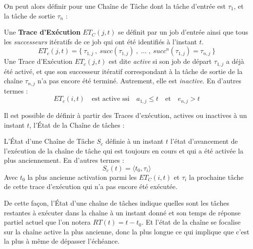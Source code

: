 \documentclass[french, a4paper, 11pt, twoside, pdftex]{StyleThese}
\begin{document}
    On peut alors définir pour une Chaîne de Tâche dont la tâche d'entrée est $\tau_{1}$, et la tâche de sortie $\tau_{n}$ : 
    \begin{definition} \label{def:TraceExecutionChaine}
    	Une \textbf{Trace d'Exécution} $ET_C(j,t)$ se définit par un job d'entrée ainsi que tous les \textit{successeurs} itératifs de ce job qui ont été identifiés à l'instant $t$.
    	\begin{equation*}
    		ET_c(j,t) = \{\: \tau_{1,j} \:,\: succ(\tau_{1,j})\:, \;\dots\; ,\: succ^n(\tau_{1,j}) = \tau_{n,j} \:\}
    	\end{equation*}    	
    	Une Trace d'Exécution $ET_c(j,t)$ est dite \emph{active} si son job de départ $\tau_{1,j}$ a déjà été activé, et que son successeur itératif correspondant à la tâche de sortie de la chaîne $\tau_{n,j}$ n'a pas encore été terminé. Autrement, elle est \textit{inactive}. En d'autres termes :
    	\begin{equation*}
    		ET_c(i,t)  \quad \textrm{est active ssi}\quad  a_{1,j} \leq t \quad \textrm{et} \quad e_{n,j} > t
    	\end{equation*} 
    \end{definition}
    
    
    Il est possible de définir à partir des Traces d'exécution, actives ou inactives à un instant $t$, l'État de la Chaîne de tâches : 
    \begin{definition}\label{def:EtatChaine}
    	L'État d'une Chaîne de Tâche $S_c$ définie à un instant $t$ l'état d'avancement de l'exécution de la chaîne de tâche qui est toujours en cours et qui a été activée la plus anciennement. En d'autres termes : 
    	\begin{equation*}
    		S_c(t)=\langle t_0, \tau_i\rangle
    	\end{equation*}
    Avec $t_0$ la plus ancienne activation parmi les $ET_C(i,t)$ et $\tau_i$ la prochaine tâche de cette trace d'exécution qui n'a pas encore été exécutée.
    \end{definition}
    De cette façon, l'État d'une chaîne de tâches indique quelles sont les tâches restantes à exécuter dans la chaîne à un instant donné et son temps de réponse partiel actuel que l'on notera $RT(t) = t - t_0$. Et l'état de la chaîne se focalise sur la chaîne active la plus ancienne, donc la plus longue ce qui implique que c'est la plus à même de dépasser l'échéance.
    
\end{document}
